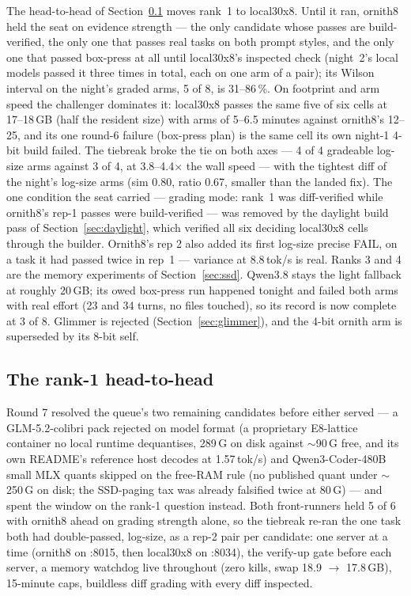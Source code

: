 The head-to-head of Section~\ref{sec:h2h} moves rank~1 to local30x8. Until it ran, ornith8 held the seat on
evidence strength --- the only candidate whose passes are build-verified, the only one that passes real tasks on
both prompt styles, and the only one that passed box-press at all until local30x8's inspected check
(night~2's local models passed it three times in total, each on one arm of a pair); its Wilson interval on the
night's graded arms, 5 of 8, is 31--86\,\%. On footprint and arm speed the challenger dominates it: local30x8
passes the same five of six cells at 17--18\,GB (half the resident size) with arms of 5--6.5 minutes against
ornith8's 12--25, and its one round-6 failure (box-press plan) is the same cell its own night-1 4-bit build
failed. The tiebreak broke the tie on both axes --- 4 of 4 gradeable log-size arms against 3 of 4, at
3.8--4.4$\times$ the wall speed --- with the tightest diff of the night's log-size arms (sim 0.80, ratio 0.67,
smaller than the landed fix). The one condition the seat carried --- grading mode: rank~1 was diff-verified
while ornith8's rep-1 passes were build-verified --- was removed by the daylight build pass of
Section~\ref{sec:daylight}, which verified all six deciding local30x8 cells through the builder. Ornith8's rep 2
also added its first log-size precise FAIL, on a task it had
passed twice in rep~1 --- variance at 8.8\,tok/s is real. Ranks 3 and 4
are the memory experiments of Section~\ref{sec:ssd}. Qwen3.8 stays the light fallback at roughly 20\,GB; its owed
box-press run happened tonight and failed both arms with real effort (23 and 34 turns, no files touched), so its
record is now complete at 3 of 8. Glimmer is rejected (Section~\ref{sec:glimmer}), and the 4-bit ornith arm is
superseded by its 8-bit self.

\subsection{The rank-1 head-to-head}\label{sec:h2h}

Round 7 resolved the queue's two remaining candidates before either served --- a GLM-5.2-colibri pack rejected
on model format (a proprietary E8-lattice container no local runtime dequantises, 289\,G on disk against
${\sim}$90\,G free, and its own README's reference host decodes at 1.57\,tok/s) and Qwen3-Coder-480B small MLX
quants skipped on the free-RAM rule (no published quant under ${\sim}$250\,G on disk; the SSD-paging tax was
already falsified twice at 80\,G) --- and spent the window on the rank-1 question instead. Both front-runners
held 5 of 6 with ornith8 ahead on grading strength alone, so the tiebreak re-ran the one task both had
double-passed, log-size, as a rep-2 pair per candidate: one server at a time (ornith8 on :8015, then local30x8
on :8034), the verify-up gate before each server, a memory watchdog live throughout (zero kills, swap
18.9 $\rightarrow$ 17.8\,GB), 15-minute caps, buildless diff grading with every diff inspected.

